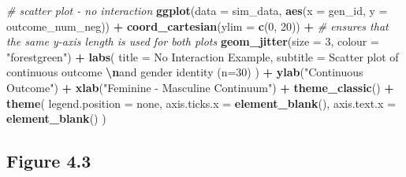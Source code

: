 \documentclass[
]{book}
\newenvironment{Shaded}{\begin{snugshade}}{\end{snugshade}}
\newcommand{\AttributeTok}[1]{\textcolor[rgb]{0.13,0.29,0.53}{#1}}
\newcommand{\CommentTok}[1]{\textcolor[rgb]{0.56,0.35,0.01}{\textit{#1}}}
\newcommand{\DecValTok}[1]{\textcolor[rgb]{0.00,0.00,0.81}{#1}}
\newcommand{\FunctionTok}[1]{\textcolor[rgb]{0.13,0.29,0.53}{\textbf{#1}}}
\newcommand{\NormalTok}[1]{#1}
\newcommand{\SpecialCharTok}[1]{\textcolor[rgb]{0.81,0.36,0.00}{\textbf{#1}}}
\newcommand{\StringTok}[1]{\textcolor[rgb]{0.31,0.60,0.02}{#1}}
\begin{document}
\begin{Shaded}
\begin{Highlighting}[]
\CommentTok{\# scatter plot {-} no interaction}
\FunctionTok{ggplot}\NormalTok{(}\AttributeTok{data =}\NormalTok{ sim\_data, }\FunctionTok{aes}\NormalTok{(}\AttributeTok{x =}\NormalTok{ gen\_id, }\AttributeTok{y =}\NormalTok{ outcome\_num\_neg)) }\SpecialCharTok{+}
  \FunctionTok{coord\_cartesian}\NormalTok{(}\AttributeTok{ylim =} \FunctionTok{c}\NormalTok{(}\DecValTok{0}\NormalTok{, }\DecValTok{20}\NormalTok{)) }\SpecialCharTok{+} \CommentTok{\# ensures that the same y{-}axis length is used for both plots}
  \FunctionTok{geom\_jitter}\NormalTok{(}\AttributeTok{size =} \DecValTok{3}\NormalTok{, }\AttributeTok{colour =} \StringTok{"forestgreen"}\NormalTok{) }\SpecialCharTok{+}
  \FunctionTok{labs}\NormalTok{(}
    \AttributeTok{title =} \StringTok{\textquotesingle{}No Interaction Example\textquotesingle{}}\NormalTok{,}
    \AttributeTok{subtitle =} \StringTok{\textquotesingle{}Scatter plot of continuous outcome }\SpecialCharTok{\textbackslash{}n}\StringTok{and gender identity (n=30)\textquotesingle{}}
\NormalTok{    ) }\SpecialCharTok{+}
  \FunctionTok{ylab}\NormalTok{(}\StringTok{"Continuous Outcome"}\NormalTok{) }\SpecialCharTok{+} \FunctionTok{xlab}\NormalTok{(}\StringTok{"Feminine {-} Masculine Continuum"}\NormalTok{) }\SpecialCharTok{+}
  \FunctionTok{theme\_classic}\NormalTok{() }\SpecialCharTok{+}
  \FunctionTok{theme}\NormalTok{(}
    \AttributeTok{legend.position =} \StringTok{\textquotesingle{}none\textquotesingle{}}\NormalTok{,}
    \AttributeTok{axis.ticks.x =} \FunctionTok{element\_blank}\NormalTok{(),}
    \AttributeTok{axis.text.x =} \FunctionTok{element\_blank}\NormalTok{()}
\NormalTok{  )}
\end{Highlighting}
\end{Shaded}

\subsection{Figure 4.3}\label{figure-4.3}
\end{document}
